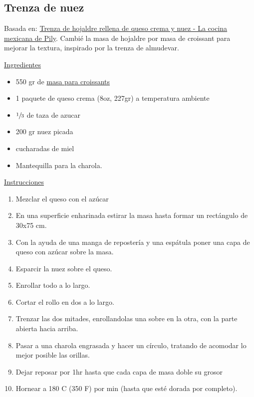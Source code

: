 \subsection{Trenza de nuez}

Basada en: \href{http://www.lacocinamexicanadepily.com/2016/12/trenza-de-hojaldre-rellena-de-queso-crema-nuez-y-miel/}{Trenza de hojaldre rellena de queso crema y nuez - La cocina mexicana de Pily}. Cambié la masa de hojaldre por masa de croissant para mejorar la textura, inspirado por la trenza de almudevar.

\underline{Ingredientes}

\begin{itemize}
\item 550 gr de \hyperref[sec:masa-para-croissants]{masa para croissants}
\item 1 paquete de queso crema (8oz, 227gr) a temperatura ambiente
\item $\sfrac{1}{3}$ de taza de azucar
\item 200 gr nuez picada
\item {} cucharadas de miel
\item Mantequilla para la charola.
\end{itemize}

\underline{Instrucciones}

\begin{enumerate}
\item Mezclar el queso con el azúcar
\item En una superficie enharinada estirar la masa hasta formar un rectángulo de \Sim 30x75 cm.
\item Con la ayuda de una manga de repostería y una espátula poner una capa de queso con azúcar sobre la masa.
\item Esparcir la nuez sobre el queso.
\item Enrollar todo a lo largo.
\item Cortar el rollo en dos a lo largo.
\item Trenzar las dos mitades, enrollandolas una sobre en la otra, con la parte abierta hacia arriba.
\item Pasar a una charola engrasada y hacer un círculo, tratando de acomodar lo mejor posible las orillas.
\item Dejar reposar por \Sim 1hr hasta que cada capa de masa doble su grosor
\item Hornear a 180 C (350 F) por  min (hasta que esté dorada por completo).
\end{enumerate}
